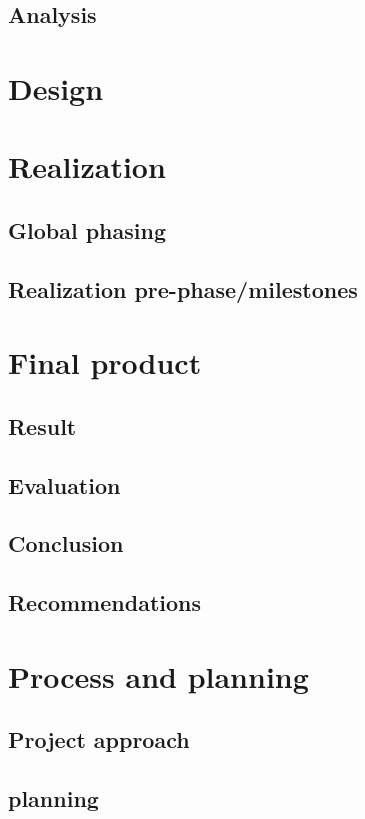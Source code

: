 \documentclass[12pt,a4paper]{report}
\begin{document}
\section{Analysis}

\chapter{Design}

\chapter{Realization}
\section{Global phasing}

\section{Realization pre-phase/milestones}

\chapter{Final product}
\section{Result}

\section{Evaluation}

\section{Conclusion}

\section{Recommendations}

\chapter{Process and planning}
\section{Project  approach}

\section{planning}
\end{document}
